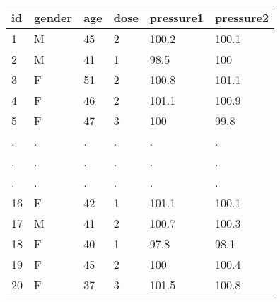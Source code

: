 \documentclass[preview]{standalone}
\begin{document}
\centering \begin{tabular}{llllll}
    \hline id & gender & age & dose & pressure1 & pressure2 \\\hline
    1 & M & 45 & 2 & 100.2 & 100.1 \\
    2 & M & 41 & 1 & 98.5 & 100 \\
    3 & F & 51 & 2 & 100.8 & 101.1 \\
    4 & F & 46 & 2 & 101.1 & 100.9 \\
    5 & F & 47 & 3 & 100 & 99.8 \\
    . & . & . & . & . & . \\
    . & . & . & . & . & . \\
    . & . & . & . & . & . \\
    16 & F & 42 & 1 & 101.1 & 100.1 \\
    17 & M & 41 & 2 & 100.7 & 100.3 \\
    18 & F & 40 & 1 & 97.8 & 98.1 \\
    19 & F & 45 & 2 & 100 & 100.4 \\
    20 & F & 37 & 3 & 101.5 & 100.8 \\
    \hline
    \end{tabular}
\end{document}
